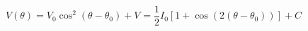 \begin{equation}
\label{eq:Photodiode_Voltage}
V(\theta) = V_0 \cos^2(\theta - {\theta}_0)+ V_{} = \frac{1}{2}I_0\left[1 + \cos(2 (\theta - \theta_0))\right]+ C
\end{equation}